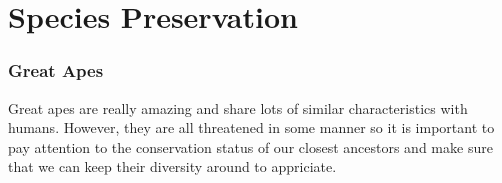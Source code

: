 \documentclass[12pt]{beamer}\usepackage[]{graphicx}\usepackage[]{color}
\begin{document}
\section{Species Preservation}
\begin{frame}
\frametitle{Great Apes}
Great apes are really amazing and share lots of similar characteristics with humans. However, they are all threatened in some manner so it is important to pay attention to the conservation status of our closest ancestors and make sure that we can keep their diversity around to appriciate.
\\~\\



\end{frame}







\end{document}
